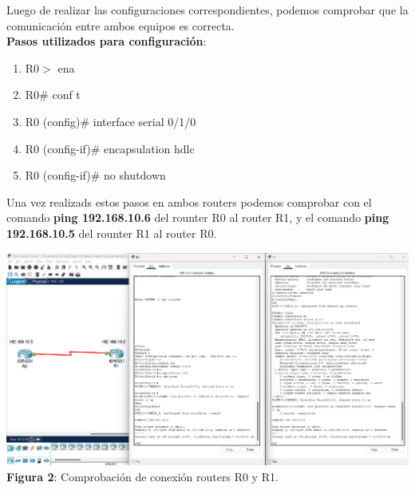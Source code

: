 \documentclass{article}
\begin{document}
    Luego de realizar las configuraciones correspondientes, podemos comprobar que la comunicación entre ambos equipos es correcta.\\
    {\bfseries Pasos utilizados para configuración}:
    \begin{enumerate}
        \item R0$>$ ena
        \item R0\# conf t
        \item R0 (config)\# interface serial 0/1/0
        \item R0 (config-if)\# encapsulation hdlc
        \item R0 (config-if)\# no shutdown 
    \end{enumerate}
    Una vez realizads estos pasos en ambos routers podemos comprobar con el comando {\bfseries ping 192.168.10.6} del rounter R0 al router R1, y el comando {\bfseries ping 192.168.10.5} del rounter R1 al router R0.

    \begin{center}
        \includegraphics[width=0.875\linewidth]{img_03} 
        \linebreak
        \small {\bfseries Figura 2}: Comprobación de conexión routers R0 y R1.
    \end{center}
\end{document}
